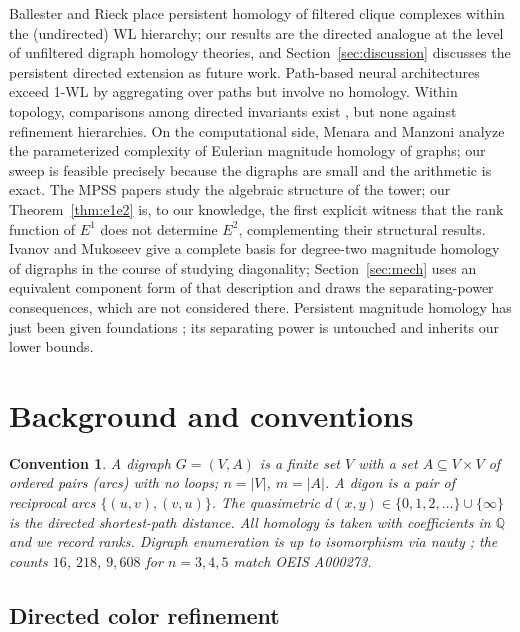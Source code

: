\documentclass[pdflatex,sn-mathphys,Numbered]{sn-jnl}
\theoremstyle{thmstyleone}
\theoremstyle{thmstyletwo}
\newtheorem{convention}[theorem]{Convention}
\newcommand{\QQ}{\mathbb{Q}}
\begin{document}
Ballester and Rieck \cite{BallesterRieck25} place persistent homology of
filtered clique complexes within the (undirected) WL hierarchy; our
results are the directed analogue at the level of unfiltered digraph
homology theories, and Section~\ref{sec:discussion} discusses the
persistent directed extension as future work. Path-based neural
architectures \cite{Michel23} exceed 1-WL by aggregating over paths but
involve no homology. Within topology, comparisons among directed
invariants exist \cite{ChaplinHT24,CaputiMR25}, but none against
refinement hierarchies. On the computational side, Menara and Manzoni
\cite{MenaraManzoni24} analyze the parameterized complexity of Eulerian
magnitude homology of graphs; our sweep is feasible precisely because the
digraphs are small and the arithmetic is exact. The MPSS papers
\cite{Asao23,HepworthRoff24,HepworthRoffIMRN} study the algebraic
structure of the tower; our Theorem~\ref{thm:e1e2} is, to our knowledge,
the first explicit witness that the rank function of $E^1$ does not
determine $E^2$, complementing their structural results. Ivanov and
Mukoseev \cite{IvanovMukoseev24} give a complete basis for degree-two
magnitude homology of digraphs in the course of studying diagonality;
Section~\ref{sec:mech} uses an equivalent component form of that
description and draws the separating-power consequences, which are not
considered there. Persistent
magnitude homology has just been given foundations \cite{BiFengLiWu26};
its separating power is untouched and inherits our lower bounds.

\section{Background and conventions}\label{sec:background}

\begin{convention}
A \emph{digraph} $G = (V, A)$ is a finite set $V$ with a set
$A \subseteq V \times V$ of ordered pairs (\emph{arcs}) with no loops;
$n = |V|$, $m = |A|$. A \emph{digon} is a pair of reciprocal arcs
$\{(u,v),(v,u)\}$. The \emph{quasimetric} $d(x,y) \in \{0,1,2,\dots\}
\cup \{\infty\}$ is the directed shortest-path distance. All homology is
taken with coefficients in $\QQ$ and we record ranks. Digraph
enumeration is up to isomorphism via nauty \cite{nauty}; the counts
$16$, $218$, $9{,}608$ for $n = 3,4,5$ match OEIS A000273.
\end{convention}

\subsection{Directed color refinement}
\end{document}
